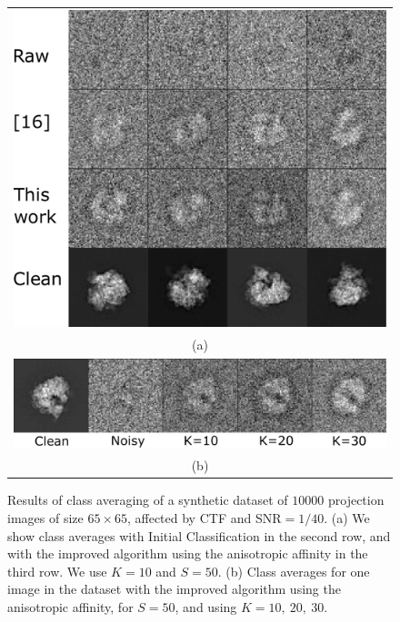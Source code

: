 \documentclass{article}
\begin{document}
\begin{figure}[!htbp]
\begin{center}
\begin{tabular}{c}
\includegraphics[width=.9 \columnwidth]{classavg_mah_K10_2.pdf}\\
(a)\\
\includegraphics[width=.9 \columnwidth]{classavg_fig3.pdf}\\
(b)
\end{tabular}
\end{center}
\vspace{-.15in}
\caption{Results of class averaging of a synthetic dataset of $10000$ projection images of size $65 \times 65$, affected by CTF and SNR$=1/40$. (a) We show class averages with Initial Classification in the second row, and with the improved algorithm using the anisotropic affinity in the third row. We use $K=10$ and $S=50$. (b) Class averages for one image in the dataset with the improved algorithm using the anisotropic affinity, for $S=50$, and using $K=10,\ 20,\ 30$.}
\vspace{-.25in}
\label{fig:classavg}
\end{figure}
\end{document}
